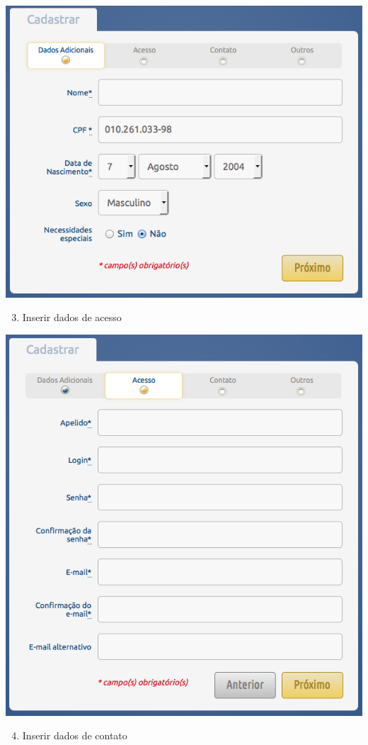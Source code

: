 \documentclass[letterpaper,10pt,english]{sphinxmanual}
\begin{document}
{\includegraphics{register-02.png}\hfill}
\begin{enumerate}
\setcounter{enumi}{2}
\item {} 
Inserir dados de acesso

\end{enumerate}

{\includegraphics{register-03.png}\hfill}
\begin{enumerate}
\setcounter{enumi}{3}
\item {} 
Inserir dados de contato

\end{enumerate}
\end{document}
